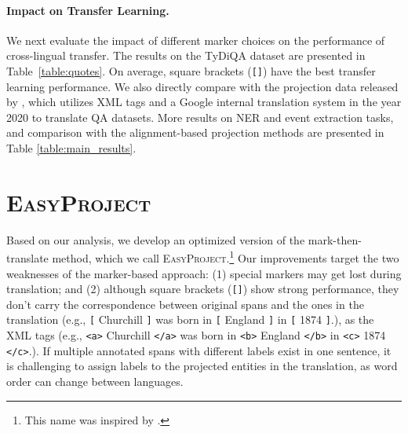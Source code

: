 \documentclass[11pt,dvipsnames]{article}
\begin{document}
\paragraph{Impact on Transfer Learning.} We next evaluate the impact of different marker choices on the performance of cross-lingual transfer.  The results on the TyDiQA dataset are presented in Table~\ref{table:quotes}.  On average, square brackets (\texttt{[]}) have the best transfer learning performance. We also  directly compare with the projection data released by  \citeauthor{hu2020xtreme}, which utilizes XML tags and a  Google internal translation system in the year 2020 to translate  QA datasets. More results on NER and event extraction tasks, and comparison with the alignment-based  projection methods are presented in Table \ref{table:main_results}.









\vspace{-2pt}
\section{\textsc{EasyProject}} 
\label{sec:easyproject_intro}
\vspace{-1pt}







 Based on our analysis, we develop an optimized version of the mark-then-translate method, which we call \textsc{EasyProject}.\footnote{This name was inspired by \citet{daume2007frustratingly}.}   Our improvements target the two weaknesses of the marker-based approach: (1) special markers may get lost during translation; and (2) although  square brackets (\texttt{[]})  show  strong performance, they don't carry the correspondence between original spans and the ones in the translation (e.g., \texttt{[} Churchill \texttt{]} was born in \texttt{[} England \texttt{]} in \texttt{[} 1874 \texttt{]}.), as the XML tags (e.g., \texttt{<a>} Churchill \texttt{</a>} was born in \texttt{<b>} England \texttt{</b>} in \texttt{<c>} 1874 \texttt{</c>}.). If multiple annotated spans with different labels exist in one sentence, it is challenging to assign labels to the  projected entities in the translation, as word order can change between languages. 
\end{document}
